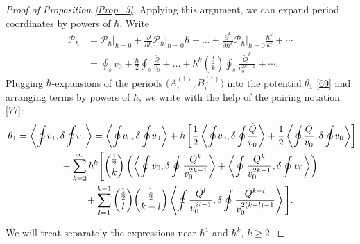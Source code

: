 \documentclass[pdftex]{sigma}
\numberwithin{equation}{section}
\theoremstyle{definition}
\begin{document}
\begin{proof}[Proof of Proposition \ref{Prop_3}]
Applying this argument, we can expand period coordinates by powers of $\hbar.$ Write
\begin{align*}%
\mathcal{P}_{\hbar}& = \mathcal{P}_{\hbar}\Big|_{\hbar=0}+ \frac{\partial}{\partial \hbar}\mathcal{P}_{\hbar}\Big|_{\hbar=0}\hbar+\dots +\frac{\partial^k}{\partial \hbar^k}\mathcal{P}_{\hbar}\Big|_{\hbar=0}\frac{\hbar^k}{k!}+\cdots\\
& =\oint_{s} {v_0} + \frac{\hbar}{2}\oint_{s} \frac{\tilde{Q}}{ v_0}+\dots +\hbar^k\binom{\frac{1}{2}}{k}\oint_{s}\frac{\tilde{Q}^k}{v_0^{2k-1}}+\cdots.
\end{align*}
Plugging $\hbar$-expansions of the periods $\big(A^{(1)}_i,B^{(1)}_i\big)$ into the potential $\theta_1$ \eqref{69} and arranging terms by powers of $\hbar$, we write with the help of the pairing notation \eqref{77}:
\begin{gather}\label{105}
\theta_1=\left\langle \oint\! v_{1}, \delta \oint\! v_{1}\right\rangle =\left\langle \oint\! v_0, \delta \oint\! v_0\right\rangle + \hbar \left[\frac{1}{2}\left\langle \oint \!v_0, \delta \oint\! \frac{\tilde{Q}}{v_0}\right\rangle +\frac{1}{2}\left\langle \oint\! \frac{\tilde{Q}}{v_0}, \delta \oint\! v_0\right\rangle \right]\!\!\!\\
\hphantom{\theta_1=}{}
+\sum^{\infty}_{k=2}\hbar^k\Bigg[\binom{\frac{1}{2}}{k}\left(\left\langle \oint v_0,\delta \oint \frac{\tilde{Q}^k}{v_0^{2k-1}}\right\rangle +\left\langle \oint \frac{\tilde{Q}^k}{v_0^{2k-1}},\delta \oint v_0\right\rangle \right)\nonumber
\\
\hphantom{\theta_1=}{}
+\sum^{k-1}_{l=1} \binom{\frac{1}{2}}{l} \binom{\frac{1}{2}}{k-l}
\left\langle \oint \frac{\tilde{Q}^l}{v_0^{2l-1}}, \delta \oint \frac{\tilde{Q}^{k-l}}{v_0^{2(k-l)-1}} \right\rangle \Bigg].\label{106}
\end{gather}

We will treat separately the expressions near $\hbar^1$ and $\hbar^k$, $k \geq 2$.


\end{proof}
\end{document}
